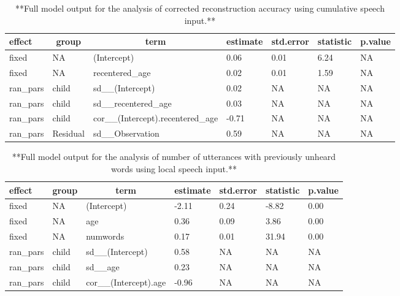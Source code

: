 \documentclass[man,mask,floatsintext]{apa6}
\begin{document}
\begin{table}[tbp]
\begin{center}
\begin{threeparttable}
\caption{\label{tab:tab-corr_reconstr_acc-cumu-MAIN}**Full model output for the analysis of corrected reconstruction accuracy using cumulative speech input.**}
\begin{tabular}{lllllll}
\toprule
effect & \multicolumn{1}{c}{group} & \multicolumn{1}{c}{term} & \multicolumn{1}{c}{estimate} & \multicolumn{1}{c}{std.error} & \multicolumn{1}{c}{statistic} & \multicolumn{1}{c}{p.value}\\
\midrule
fixed & NA & (Intercept) & 0.06 & 0.01 & 6.24 & NA\\
fixed & NA & recentered\_age & 0.02 & 0.01 & 1.59 & NA\\
ran\_pars & child & sd\_\_(Intercept) & 0.02 & NA & NA & NA\\
ran\_pars & child & sd\_\_recentered\_age & 0.03 & NA & NA & NA\\
ran\_pars & child & cor\_\_(Intercept).recentered\_age & -0.71 & NA & NA & NA\\
ran\_pars & Residual & sd\_\_Observation & 0.59 & NA & NA & NA\\
\bottomrule
\end{tabular}
\end{threeparttable}
\end{center}
\end{table}

\begin{table}[tbp]
\begin{center}
\begin{threeparttable}
\caption{\label{tab:tab-unseen_words-local-MAIN}**Full model output for the analysis of number of utterances with previously unheard words using local speech input.**}
\begin{tabular}{lllllll}
\toprule
effect & \multicolumn{1}{c}{group} & \multicolumn{1}{c}{term} & \multicolumn{1}{c}{estimate} & \multicolumn{1}{c}{std.error} & \multicolumn{1}{c}{statistic} & \multicolumn{1}{c}{p.value}\\
\midrule
fixed & NA & (Intercept) & -2.11 & 0.24 & -8.82 & 0.00\\
fixed & NA & age & 0.36 & 0.09 & 3.86 & 0.00\\
fixed & NA & numwords & 0.17 & 0.01 & 31.94 & 0.00\\
ran\_pars & child & sd\_\_(Intercept) & 0.58 & NA & NA & NA\\
ran\_pars & child & sd\_\_age & 0.23 & NA & NA & NA\\
ran\_pars & child & cor\_\_(Intercept).age & -0.96 & NA & NA & NA\\
\bottomrule
\end{tabular}
\end{threeparttable}
\end{center}
\end{table}
\end{document}
